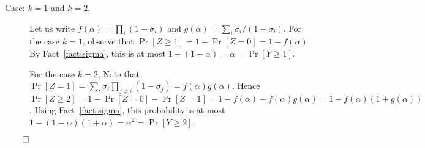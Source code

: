 \begin{description}
        \item[Case: $k = 1$ and $k = 2$.]
        Let us write $f(\alpha) = \prod_i (1 - \sigma_i)$ and $g(\alpha) = \sum_i \sigma_i/(1 - \sigma_i)$. 
        For the case $k = 1$, 
        observe that $\Pr[Z \geq 1] = 1 - \Pr[Z = 0] = 1 - f(\alpha)$ 
        By Fact~\ref{fact:sigma}, this is at most $1 - (1-\alpha) = \alpha = \Pr[Y \geq 1]$.

        For the case $k = 2$,
        Note that $\Pr[Z = 1] = \sum_i \sigma_i \prod_{j \neq i} (1 - \sigma_j) = f(\alpha) g(\alpha)$. 
        Hence $\Pr[Z \geq 2] = 1 - \Pr[Z = 0] - \Pr[Z = 1] = 1 - f(\alpha) - f(\alpha) g(\alpha) 
        = 1 - f(\alpha) (1 + g(\alpha) )$. 
        Using Fact~\ref{fact:sigma}, this probability is at most 
        $1 - (1-\alpha)(1 + \alpha) = \alpha^2 = \Pr[Y \geq 2]$. 
    \end{description}

    \hfill$\qed$

